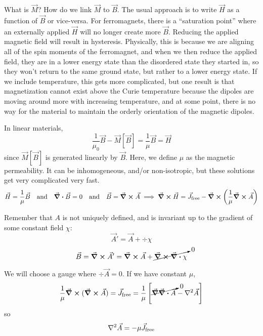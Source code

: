 \documentclass[a4paper,twoside,master.tex]{subfiles}
\begin{document}
What is $ \vec{M} $? How do we link $ \vec{M} $ to $ \vec{B} $. The usual approach is to write $ \vec{H} $ as a function of $ \vec{B} $ or vice-versa. For ferromagnets, there is a ``saturation point'' where an externally applied $ \vec{H} $ will no longer create more $ \vec{B} $. Reducing the applied magnetic field will result in hysteresis. Physically, this is because we are aligning all of the spin moments of the ferromagnet, and when we then reduce the applied field, they are in a lower energy state than the disordered state they started in, so they won't return to the same ground state, but rather to a lower energy state. If we include temperature, this gets more complicated, but one result is that magnetization cannot exist above the Curie temperature because the dipoles are moving around more with increasing temperature, and at some point, there is no way for the material to maintain the orderly orientation of the magnetic dipoles.

In linear materials,
\begin{equation}
    \frac{1}{\mu_0} \vec{B} - \vec{M}[ \vec{B}] = \frac{1}{\mu} \vec{B} = \vec{H}
\end{equation}
since $ \vec{M}[ \vec{B} ] $ is generated linearly by $ \vec{B} $. Here, we define $\mu$ as the magnetic permeability. It can be inhomogeneous, and/or non-isotropic, but these solutions get very complicated very fast.
\begin{equation}
    \vec{H} = \frac{1}{\mu} \vec{B} \qand \div{ \vec{B}} = 0 \qand \vec{B} = \curl{ \vec{A}} \implies \curl{ \vec{H}} = \vec{J}_{\text{free}} - \curl{\left( \frac{1}{\mu} \curl{ \vec{A}} \right)}
\end{equation}

Remember that $ A $ is not uniquely defined, and is invariant up to the gradient of some constant field $ \chi $:
\begin{equation}
    \vec{A}' = \vec{A} + \div{\chi}
\end{equation}
\begin{equation}
    \vec{B} = \curl{\vec{A}'} = \curl{\vec{A}} + \cancelto{0}{\curl{\div{\chi}}}
\end{equation}

We will choose a gauge where $ \div{\vec{A}} = 0 $. If we have constant $ \mu $,
\begin{equation}
    \frac{1}{\mu} \curl{(\curl{ \vec{A}})} = \vec{J}_{\text{free}} = \frac{1}{\mu}\left[\cancelto{0}{\grad{\div{ \vec{A}}}} - \laplacian{ \vec{A}} \right]
\end{equation}
so
\begin{equation}
    \laplacian{ \vec{A}} = -\mu \vec{J}_{\text{free}}
\end{equation}
\end{document}

